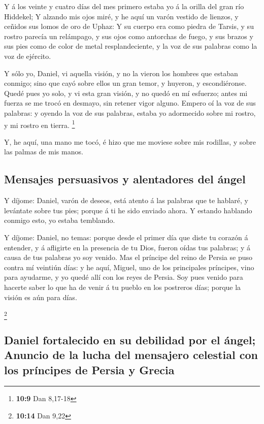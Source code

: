  Y á los veinte y cuatro días del mes primero estaba yo á la
orilla del gran río Hiddekel;  Y alzando mis ojos miré, y he
aquí un varón vestido de lienzos, y ceñidos sus lomos de oro de Uphaz:
 Y su cuerpo era como piedra de Tarsis, y su rostro parecía
un relámpago, y sus ojos como antorchas de fuego, y sus brazos y sus
pies como de color de metal resplandeciente, y la voz de sus palabras
como la voz de ejército.

 Y sólo yo, Daniel, vi aquella visión, y no la vieron los
hombres que estaban conmigo; sino que cayó sobre ellos un gran temor, y
huyeron, y escondiéronse.  Quedé pues yo solo, y vi esta
gran visión, y no quedó en mí esfuerzo; antes mi fuerza se me trocó en
desmayo, sin retener vigor alguno.  Empero oí la voz de sus
palabras: y oyendo la voz de sus palabras, estaba yo adormecido sobre mi
rostro, y mi rostro en tierra. \footnote{\textbf{10:9} Dan 8,17-18}

 Y, he aquí, una mano me tocó, é hizo que me moviese sobre
mis rodillas, y sobre las palmas de mis manos.

\hypertarget{mensajes-persuasivos-y-alentadores-del-uxe1ngel}{%
\subsection{Mensajes persuasivos y alentadores del
ángel}\label{mensajes-persuasivos-y-alentadores-del-uxe1ngel}}

 Y díjome: Daniel, varón de deseos, está atento á las
palabras que te hablaré, y levántate sobre tus pies; porque á ti he sido
enviado ahora. Y estando hablando conmigo esto, yo estaba temblando.

 Y díjome: Daniel, no temas: porque desde el primer día que
diste tu corazón á entender, y á afligirte en la presencia de tu Dios,
fueron oídas tus palabras; y á causa de tus palabras yo soy venido.
 Mas el príncipe del reino de Persia se puso contra mí
veintiún días: y he aquí, Miguel, uno de los principales príncipes, vino
para ayudarme, y yo quedé allí con los reyes de Persia. 
Soy pues venido para hacerte saber lo que ha de venir á tu pueblo en los
postreros días; porque la visión es aún para días.

\footnote{\textbf{10:14} Dan 9,22}

\hypertarget{daniel-fortalecido-en-su-debilidad-por-el-uxe1ngel-anuncio-de-la-lucha-del-mensajero-celestial-con-los-pruxedncipes-de-persia-y-grecia}{%
\subsection{Daniel fortalecido en su debilidad por el ángel; Anuncio de
la lucha del mensajero celestial con los príncipes de Persia y
Grecia}\label{daniel-fortalecido-en-su-debilidad-por-el-uxe1ngel-anuncio-de-la-lucha-del-mensajero-celestial-con-los-pruxedncipes-de-persia-y-grecia}}

